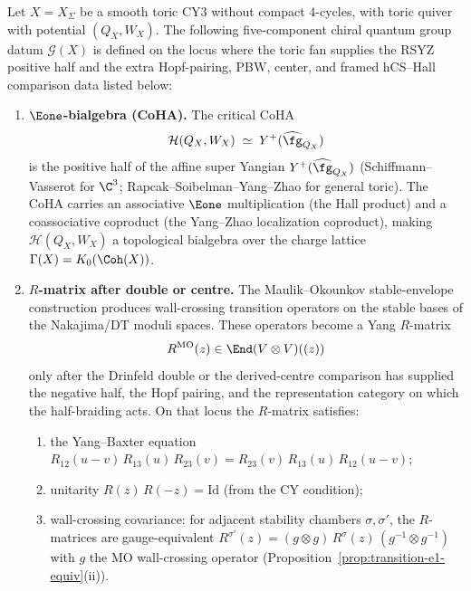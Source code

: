 \begin{theorem}
\label{thm:toric-cy3-chiral-qg}
Let $X = X_\Sigma$ be a smooth toric CY3 without compact $4$-cycles,
with toric quiver with potential $(Q_X, W_X)$.
The following five-component chiral quantum group datum
$\mathcal{G}(X)$ is defined on the locus where the toric fan supplies
the RSYZ positive half and the extra Hopf-pairing, PBW, center, and
framed hCS--Hall comparison data listed below:
\begin{enumerate}[label=\textup{(\Roman*)}]
 \item \textbf{$\Eone$-bialgebra \textup{(}CoHA\textup{)}.}
 The critical CoHA
 \[
 \mathcal{H}(Q_X, W_X) \;\simeq\; Y^+(\widehat{\fg}_{Q_X})
 \]
 is the positive half of the affine super Yangian
 $Y^+(\widehat{\fg}_{Q_X})$
 \textup{(}Schiffmann--Vasserot for $\C^3$;
 Rapcak--Soibelman--Yang--Zhao for general toric\textup{)}.
 The CoHA carries an associative
 $\Eone$ multiplication \textup{(}the Hall product\textup{)} and
 a coassociative coproduct
 \textup{(}the Yang--Zhao localization coproduct\textup{)},
 making $\mathcal{H}(Q_X, W_X)$ a topological bialgebra
 over the charge lattice
 $\Gamma(X) = K_0(\Coh(X))$.

 \item \textbf{$R$-matrix after double or centre.}
 The Maulik--Okounkov stable-envelope construction produces
 wall-crossing transition operators on the stable bases of the
 Nakajima/DT moduli spaces. These operators become a Yang
 $R$-matrix
 \[
 R^{\mathrm{MO}}(z) \in \End(V \otimes V)((z))
 \]
 only after the Drinfeld double or the derived-centre comparison has
 supplied the negative half, the Hopf pairing, and the representation
 category on which the half-braiding acts. On that locus the
 $R$-matrix satisfies:
 \begin{enumerate}[label=\textup{(\alph*)}]
 \item the Yang--Baxter equation
 $R_{12}(u{-}v)\,R_{13}(u)\,R_{23}(v) =
 R_{23}(v)\,R_{13}(u)\,R_{12}(u{-}v)$;
 \item unitarity $R(z)\,R(-z) = \mathrm{Id}$
 \textup{(}from the CY condition\textup{)};
 \item wall-crossing covariance: for adjacent stability
 chambers $\sigma, \sigma'$, the $R$-matrices are
 gauge-equivalent
 $R^{\sigma'}(z) = (g \otimes g)\,R^\sigma(z)\,
 (g^{-1} \otimes g^{-1})$
 with $g$ the MO wall-crossing operator
 \textup{(}Proposition~\textup{\ref{prop:transition-e1-equiv}(ii)}\textup{)}.
 \end{enumerate}


\end{enumerate}
\end{theorem}
